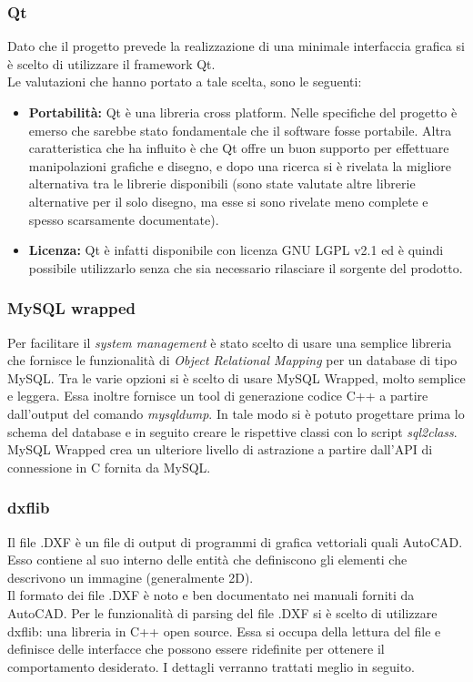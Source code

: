 {\subsubsection{Qt}
Dato che il progetto prevede la realizzazione di una minimale interfaccia grafica si è scelto di utilizzare il framework Qt. \\
Le valutazioni che hanno portato a tale scelta, sono le seguenti:
\begin{itemize}
\item \textbf{Portabilità:} Qt è una libreria cross platform. Nelle specifiche del progetto è emerso che sarebbe stato fondamentale che il software fosse portabile. Altra caratteristica che ha influito è che Qt offre un buon supporto per effettuare manipolazioni grafiche e disegno, e dopo una ricerca si è rivelata la migliore alternativa tra le librerie disponibili (sono state valutate altre librerie alternative per il solo disegno, ma esse si sono rivelate meno complete e spesso scarsamente documentate).
\item \textbf{Licenza: } Qt è infatti disponibile con licenza  GNU LGPL v2.1 ed è quindi possibile utilizzarlo senza che sia necessario rilasciare il sorgente del prodotto.
\end{itemize}
\subsubsection{MySQL wrapped}
Per facilitare il \textit{system management} è stato scelto di usare una semplice libreria che fornisce le funzionalità di \textit{Object Relational Mapping} per un database di tipo MySQL. Tra le varie opzioni si è scelto di usare MySQL Wrapped, molto semplice e leggera. Essa inoltre fornisce un tool di generazione codice C++ a partire dall'output del comando \textit{mysqldump}. In tale modo si è potuto progettare prima lo schema del database e in seguito creare le rispettive classi con lo script \textit{sql2class}. MySQL Wrapped crea un ulteriore livello di astrazione a partire dall'API di connessione in C fornita da MySQL.

\subsubsection{dxflib}
Il file .DXF è un file di output di programmi di grafica vettoriali quali AutoCAD. Esso contiene al suo interno delle entità che definiscono gli elementi che descrivono un immagine (generalmente 2D). \\
Il formato dei file .DXF è noto e ben documentato nei manuali forniti da AutoCAD.
Per le funzionalità di parsing del file .DXF si è scelto di utilizzare dxflib: una libreria in C++ open source. Essa si occupa della lettura del file e definisce delle interfacce che possono essere ridefinite per ottenere il comportamento desiderato. I dettagli verranno trattati meglio in seguito.

}
